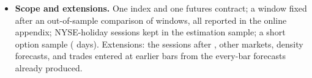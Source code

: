 \begin{itemize}
\begin{itemize}
  \item Ours come from one unhedged straddle a day, are far smaller, are reported at bid/ask too, and rest on a few
    days.
  \end{itemize}
\item \textbf{Scope and extensions.} One index and one futures contract; a window fixed after an out-of-sample
  comparison of windows, all reported in the online appendix; NYSE-holiday sessions kept in the estimation sample; a
  short option sample (\rheSzDays{} days). Extensions: the sessions after \rhorSpanEnd, other markets, density
  forecasts, and trades entered at earlier bars from the every-bar forecasts already produced.
\end{itemize}


